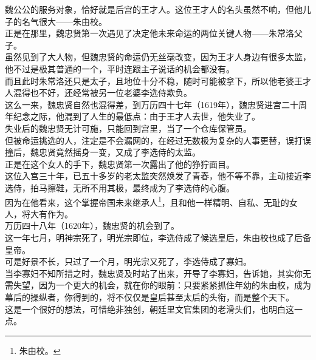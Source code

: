 \begin{multicols}{\theparacolNo}
魏公公的服务对象，恰好就是后宫的王才人。这位王才人的名头虽然不响，但他儿子的名气很大——朱由校。\\

正是在那里，魏忠贤第一次遇见了决定他未来命运的两位关键人物——朱常洛父子。\\

虽然见到了大人物，但魏忠贤的命运仍无丝毫改变，因为王才人身边有很多太监，他不过是极其普通的一个，平时连跟主子说话的机会都没有。\\

而且此时朱常洛还只是太子，且地位十分不稳，随时可能被拿下，所以他老婆王才人混得也不好，还经常被另一位老婆李选侍欺负。\\

这么一来，魏忠贤自然也混得差，到万历四十七年（1619年），魏忠贤进宫二十周年纪念之际，他混到了人生的最低点：由于王才人去世，他失业了。\\

失业后的魏忠贤无计可施，只能回到宫里，当了一个仓库保管员。\\

但被命运挑选的人，注定是不会漏网的，在经过无数极为复杂的人事更替，误打误撞后，魏忠贤竟然摇身一变，又成了李选侍的太监。\\

正是在这个女人的手下，魏忠贤第一次露出了他的狰狞面目。\\

这位入宫三十年，已五十多岁的老太监突然焕发了青春，他不等不靠，主动接近李选侍，拍马擦鞋，无所不用其极，最终成为了李选侍的心腹。\\

因为在他看来，这个掌握帝国未来继承人\footnote{朱由校。}，且和他一样精明、自私、无耻的女人，将大有作为。\\

万历四十八年（1620年），魏忠贤的机会到了。\\

这一年七月，明神宗死了，明光宗即位，李选侍成了候选皇后，朱由校也成了后备皇帝。\\

可是好景不长，只过了一个月，明光宗又死了，李选侍成了寡妇。\\

当李寡妇不知所措之时，魏忠贤及时站了出来，开导了李寡妇，告诉她，其实你无需失望，因为一个更大的机会，就在你的眼前：只要紧紧抓住年幼的朱由校，成为幕后的操纵者，你得到的，将不仅仅是皇后甚至太后的头衔，而是整个天下。\\

这是一个很好的想法，可惜绝非独创，朝廷里文官集团的老滑头们，也明白这一点。\\


\end{multicols}
